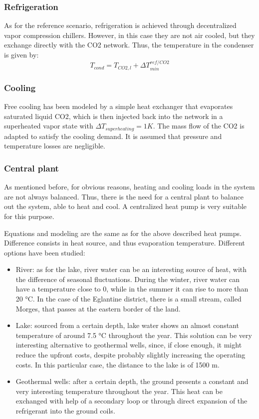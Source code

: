 \documentclass{article}
\begin{document}
\subsubsection{Refrigeration}
As for the reference scenario, refrigeration is achieved through decentralized vapor compression chillers. However, in this case they are not air cooled, but they exchange directly with the CO2 network. Thus, the temperature in the condenser is given by:
\begin{equation}
    T_{cond} = T_{CO2,l} + \Delta T_{min}^{ref/CO2}
\end{equation}

\subsubsection{Cooling}
Free cooling has been modeled by a simple heat exchanger that evaporates saturated liquid CO2, which is then injected back into the network in a superheated vapor state with $\Delta T_{superheating} = 1K$. The mass flow of the CO2 is adapted to satisfy the cooling demand. It is assumed that pressure and temperature losses are negligible.

\subsubsection{Central plant}
As mentioned before, for obvious reasons, heating and cooling loads in the system are not always balanced. Thus, there is the need for a central plant to balance out the system, able to heat and cool. A centralized heat pump is very suitable for this purpose.

Equations and modeling are the same as for the above described heat pumps. Difference consists in heat source, and thus evaporation temperature. Different options have been studied:
\begin{itemize}
    \item River: as for the lake, river water can be an interesting source of heat, with the difference of seasonal fluctuations. During the winter, river water can have a temperature close to 0, while in the summer it can rise to more than 20 \si{\celsius}. In the case of the Eglantine district, there is a small stream, called Morges, that passes at the eastern border of the land.
    \item Lake: sourced from a certain depth, lake water shows an almost constant temperature of around 7.5 \si{\celsius} throughout the year. This solution can be very interesting alternative to geothermal wells, since, if close enough, it might reduce the upfront costs, despite probably slightly increasing the operating costs. In this particular case, the distance to the lake is of 1500 m.
    \item Geothermal wells: after a certain depth, the ground presents a constant and very interesting temperature throughout the year. This heat can be exchanged with help of a secondary loop or through direct expansion of the refrigerant into the ground coils.
\end{itemize}
\end{document}
